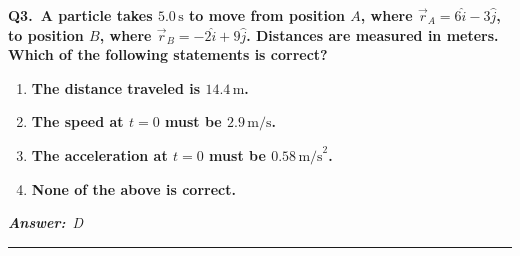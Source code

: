 \documentclass[11pt]{article}
\newcommand{\QuestionStyle}[1]{{\large\bfseries\boldmath #1}}
\newcommand{\AnswerStyle}[1]{{\large\bfseries\boldmath #1}}
\newcommand{\ReasonStyle}[1]{{\normalsize #1}}
\newif\ifshowreason
\newcommand{\Correct}[2]{%
  \item \AnswerStyle{\textcolor{AnsRed}{#1}}%
  \ifshowreason\\[-0.2em]
    \ReasonStyle{\textcolor{AnsRed}{#2}}%
  \fi
}
\newcommand{\Wrong}[2]{%
  \item \AnswerStyle{\textcolor{WrongBlue}{#1}}%
  \ifshowreason\\[-0.2em]
    \ReasonStyle{\textcolor{WrongBlue}{#2}}%
  \fi
}
\newcommand{\QBlock}[4]{%
  \Needspace{8\baselineskip}%
  \noindent
  \begin{minipage}{\linewidth}
    \QuestionStyle{#1.~#2}

    \vspace{0.25em}
    \begin{enumerate}
      #3
    \end{enumerate}

    \vspace{0.1em}
    \noindent\textcolor{AnsRed}{\textit{\textbf{Answer:}~#4}}

    \vspace{0.25em}
    \hrule height 0.4pt
  \end{minipage}
  \vspace{0.75em}
}
\begin{document}
\QBlock{Q3}{A particle takes $5.0\,\text{s}$ to move from position $A$, where $\vec r_A = 6\hat i - 3\hat j$, to position $B$, where $\vec r_B = -2\hat i + 9\hat j$. Distances are measured in meters. Which of the following statements is correct?}{%
\Wrong{The distance traveled is $14.4\,\text{m}$.}{$\sqrt{(-2-6)^2+(9-(-3))^2}=\sqrt{208}\approx 14.4\,\text{m}$ is the magnitude of the displacement, not necessarily the distance traveled. The actual distance depends on the path taken between $A$ and $B$.}
\Wrong{The speed at $t=0$ must be $2.9\,\text{m/s}$.}{This treats displacement magnitude divided by elapsed time as the initial speed. That calculation gives only an average based on net displacement, not the instantaneous speed at the start.}
\Wrong{The acceleration at $t=0$ must be $0.58\,\text{m/s}^2$.}{There is not enough information to determine the instantaneous acceleration at $t=0$. Knowing only initial position, final position, and total time does not uniquely fix the motion.}
\Correct{None of the above is correct.}{The displacement is $\Delta \vec r = (-2-6)\hat i + (9-(-3))\hat j = -8\hat i + 12\hat j$, whose magnitude is $\sqrt{208}\approx 14.4\,\text{m}$. However, that is not necessarily the distance traveled, and neither the initial speed nor the initial acceleration is uniquely determined from only the endpoints and elapsed time, so none of the listed statements is correct.}
}{D}
\end{document}
